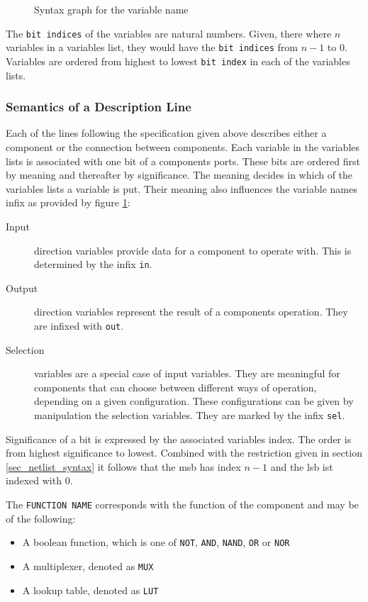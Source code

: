 \begin{figure}[Hbt]
	
	\caption{Syntax graph for the variable name}
		\label{img_var_name_syntax}
\end{figure}

The \texttt{bit indices} of the variables are natural numbers. 
Given, there where $n$ variables in a variables list, they would have the \texttt{bit indices} from $n-1$ to $0$.
Variables are ordered from highest to lowest \texttt{bit index} in each of the variables lists.

\subsubsection{Semantics of a Description Line}
Each of the lines following the specification given above describes either a component or the connection between components.
Each variable in the variables lists is associated with one bit of a components ports.
These bits are ordered first by meaning and thereafter by significance.
The meaning decides in which of the variables lists a variable is put. Their meaning also influences the variable names infix as provided by figure \ref{img_var_name_syntax}:
\begin{description}
	\item[Input] direction variables provide data for a component to operate with. This is determined by the infix \texttt{in}.
	\item[Output] direction variables represent the result of a components operation. They are infixed with \texttt{out}.
		\item[Selection] variables are a special case of input variables. They are meaningful for components that can choose between different ways of operation, depending on a given configuration. These configurations can be given by manipulation the selection variables. They are marked by the infix \texttt{sel}.
\end{description}
Significance of a bit is expressed by the associated variables index. The order is from highest significance to lowest. 
Combined with the restriction given in section \ref{sec_netlist_syntax} it follows that the \gls{msb} has index $n-1$ and the \gls{lsb} ist indexed with $0$.

The \texttt{FUNCTION NAME} corresponds with the function of the component and may be of the following:
\begin{itemize}
	\item A boolean function, which is one of 
		\texttt{NOT},
		\texttt{AND},
		\texttt{NAND},
		\texttt{OR} or
		\texttt{NOR}
	\item A multiplexer, denoted as \texttt{MUX}
	\item A lookup table, denoted as \texttt{LUT}
\end{itemize}

